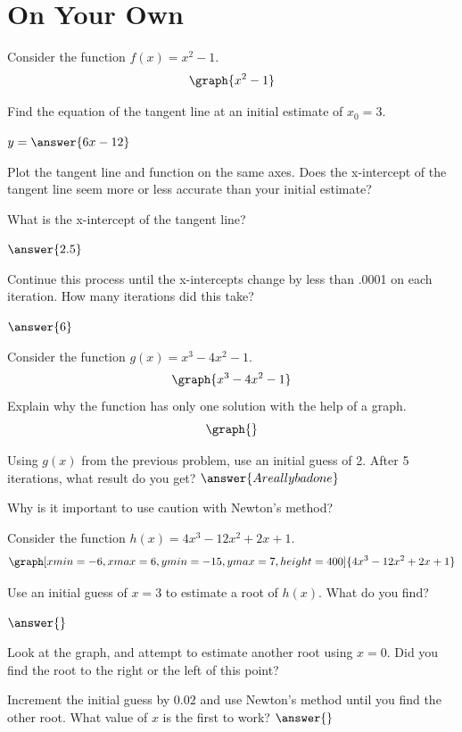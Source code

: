 \documentclass{ximera}
\begin{document}
\section{On Your Own}
\begin{question}
Consider the function $f(x) = x^2-1$.
\[
\graph{x^2-1}
\]

Find the equation of the tangent line at an initial estimate of $x_0=3$.

$y = \answer{6x-12}$

Plot the tangent line and function on the same axes. Does the x-intercept of the tangent line seem more or less accurate than your initial estimate?

\begin{multipleChoice}
\end{multipleChoice}

What is the x-intercept of the tangent line?

$\answer{2.5}$

Continue this process until the x-intercepts change by less than .0001 on each iteration. How many iterations did this take?

$\answer{6}$
\end{question}
\begin{question}
Consider the function $g(x) = x^3-4x^2-1$.
\[
\graph{x^3-4x^2-1}
\]
Explain why the function has only one solution with the help of a graph.
\[
\graph{}
\]
\begin{freeResponse}
\end{freeResponse}
Using $g(x)$ from the previous problem, use an initial guess of 2. After 5 iterations, what result do you get?
$\answer{A really bad one}$

Why is it important to use caution with Newton's method?
\begin{freeResponse}
\end{freeResponse}
\end{question}

\begin{question}
Consider the function $h(x) = 4x^3 - 12x^2 + 2x + 1$.
\[
\graph[xmin=-6,xmax=6,ymin=-15,ymax=7,height=400]{4x^3 - 12x^2 + 2x + 1}
\]

Use an initial guess of $x=3$ to estimate a root of $h(x)$. What do you find?

$\answer{}$

Look at the graph, and attempt to estimate another root using $x = 0$. Did you find the root to the right or the left of this point?

\begin{multipleChoice}
\end{multipleChoice}

Increment the initial guess by $0.02$ and use Newton's method until you find the other root. What value of $x$ is the first to work?
$\answer{}$
\end{question}
\end{document}
